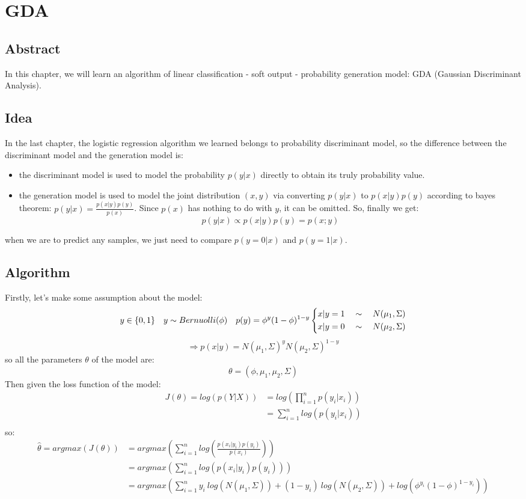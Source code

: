 \documentclass{report}
\begin{document}
\chapter{GDA}
\section{Abstract}
In this chapter, we will learn an algorithm of linear classification - soft output - probability generation model: GDA (Gaussian Discriminant Analysis).
\section{Idea}
In the last chapter, the logistic regression algorithm we learned belongs to probability discriminant model, so the difference between the discriminant model and the generation model is:
\begin{itemize}
	\item the discriminant model is used to model the probability $p(y|x)$ directly to obtain its truly probability value.
	\item the generation model is used to model the joint distribution $(x,y)$ via converting $p(y|x)$ to $p(x|y)p(y)$ according to bayes theorem: $p(y|x)=\frac{p(x|y)p(y)}{p(x)}$. Since $p(x)$ has nothing to do with $y$, it can be omitted. So, finally we get:$$
p(y|x)\propto p(x|y)p(y)=p(x;y)
$$
\end{itemize}
when we are to predict any samples, we just need to compare $p(y=0|x)$ and $p(y=1|x)$.
\newpage
\section{Algorithm}
Firstly, let's make some assumption about the model:
$$
y\in \{0,1\}\quad y\sim Bernuolli(\phi)\quad p(y)=\phi^y(1-\phi)^{1-y}\\\left \{\begin{aligned}x|y=1 \quad \sim \quad N(\mu_1,\Sigma)\\x|y=0 \quad \sim \quad N(\mu_2,\Sigma)\end{aligned}\right.
$$
$$
\Longrightarrow p(x|y)=N(\mu_1,\Sigma)^yN(\mu_2,\Sigma)^{1-y}
$$
so all the parameters $\theta$ of the model are:
$$
\theta=(\phi, \mu_1, \mu_2, \Sigma)
$$
Then given the loss function of the model:
$$
\begin{aligned}
J(\theta)=log(p(Y|X))&=log(\prod_{i=1}^n p(y_i|x_i))\\
&=\sum_{i=1}^n log(p(y_i|x_i))\\
\end{aligned}
$$
so:
$$
\begin{aligned}
\hat{\theta}=argmax(J(\theta))&=argmax(\sum_{i=1}^nlog(\frac{p(x_i|y_i)p(y_i)}{p(x_i)}))\\
&=argmax(\sum_{i=1}^n log(p(x_i|y_i)p(y_i)))\\
&=argmax(\sum_{i=1}^n y_i\ log(N(\mu_1,\Sigma))+(1-y_i)\ log(N(\mu_2,\Sigma))+log(\phi^{y_i} (1-\phi)^{1-y_i}))
\end{aligned}
$$
\end{document}
